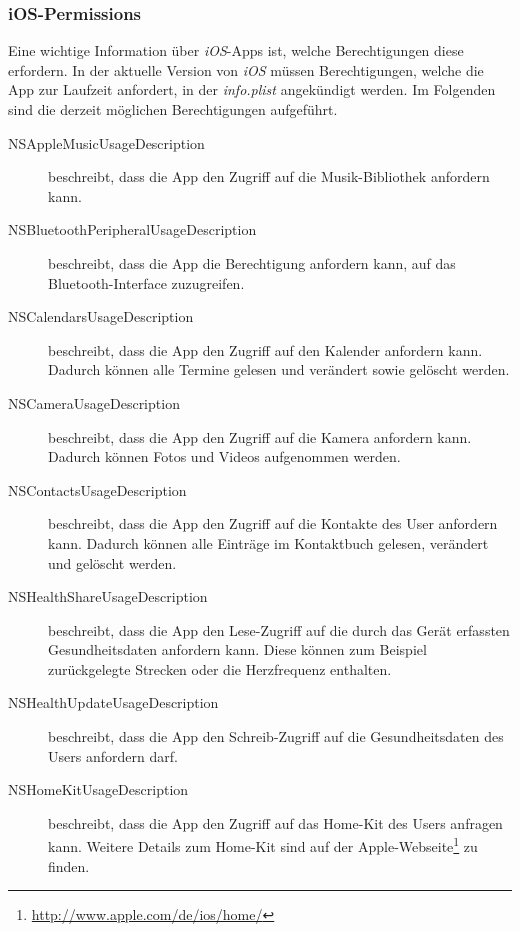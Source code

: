 \subsubsection{iOS-Permissions}
Eine wichtige Information über \textit{iOS}-Apps ist, welche Berechtigungen diese erfordern. In der aktuelle Version von \textit{iOS} müssen Berechtigungen, welche die App zur Laufzeit anfordert, in der \textit{info.plist} angekündigt werden. Im Folgenden sind die derzeit möglichen Berechtigungen aufgeführt.

\newpage
\begin{description}
	\item[NSAppleMusicUsageDescription]  beschreibt, dass die App den Zugriff auf die Musik-Bibliothek anfordern kann.
	
	\item[NSBluetoothPeripheralUsageDescription] beschreibt, dass die App die Berechtigung anfordern kann, auf das Bluetooth-Interface zuzugreifen.
	
	\item[NSCalendarsUsageDescription] beschreibt, dass die App den Zugriff auf den Kalender anfordern kann. Dadurch können alle Termine gelesen und verändert sowie gelöscht werden.
	
	\item[NSCameraUsageDescription] beschreibt, dass die App den Zugriff auf die Kamera anfordern kann. Dadurch können Fotos und Videos aufgenommen werden.
	
	\item[NSContactsUsageDescription] beschreibt, dass die App den Zugriff auf die Kontakte des User anfordern kann. Dadurch können alle Einträge im Kontaktbuch gelesen, verändert und gelöscht werden. 
	
	\item[NSHealthShareUsageDescription] beschreibt, dass die App den Lese-Zugriff auf die durch das Gerät erfassten Gesundheitsdaten anfordern kann. Diese können zum Beispiel zurückgelegte Strecken oder die Herzfrequenz enthalten.
	
	\item[NSHealthUpdateUsageDescription] beschreibt, dass die App den Schreib-Zugriff auf die Gesundheitsdaten des Users anfordern darf.
	
	\item[NSHomeKitUsageDescription] beschreibt, dass die App den Zugriff auf das Home-Kit des Users anfragen kann. Weitere Details zum Home-Kit sind auf der Apple-Webseite\footnote{\url{http://www.apple.com/de/ios/home/}} zu finden.
	

\end{description}
